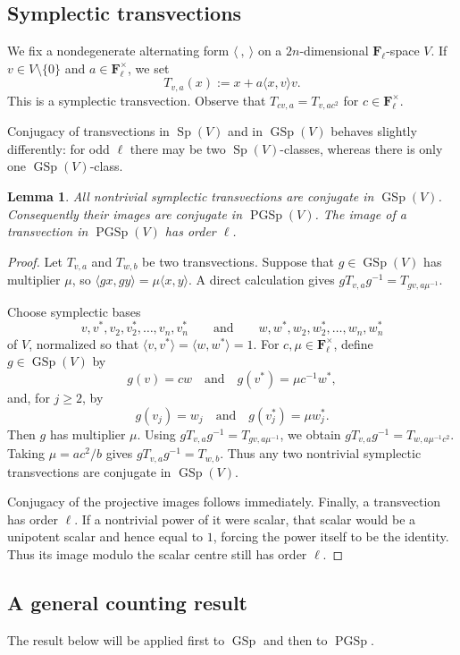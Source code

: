 \documentclass[11pt,hidelinks]{amsart}
\newtheorem{lemma}[theorem]{Lemma}
\newcommand{\F}{\mathbf F}
\newcommand{\GSp}{\operatorname{GSp}}
\newcommand{\Sp}{\operatorname{Sp}}
\newcommand{\PGSp}{\operatorname{PGSp}}
\begin{document}
\subsection{Symplectic transvections}

We fix a nondegenerate alternating form $\langle\ ,\ \rangle$ on a $2n$-dimensional $\F_\ell$-space $V$. If $v\in V\setminus\{0\}$ and $a\in\F_\ell^\times$, we set
\[T_{v,a}(x):=x+a\langle x,v\rangle v.\] This is a symplectic transvection. Observe that $T_{cv,a}=T_{v,ac^2}$ for $c\in\F_\ell^\times$.

Conjugacy of transvections in $\Sp(V)$ and in $\GSp(V)$ behaves slightly differently: for odd $\ell$ there may be two $\Sp(V)$-classes, whereas there is only one $\GSp(V)$-class.

\begin{lemma}\label{lem:GSp-conjugacy}
All nontrivial symplectic transvections are conjugate in $\GSp(V)$. Consequently their images are conjugate in $\PGSp(V)$. The image of a transvection in $\PGSp(V)$ has order $\ell$.
\end{lemma}

\begin{proof}
Let $T_{v,a}$ and $T_{w,b}$ be two transvections. Suppose that $g\in\GSp(V)$ has multiplier $\mu$, so $\langle gx,gy\rangle=\mu\langle x,y\rangle$. A direct calculation gives
$gT_{v,a}g^{-1}=T_{gv,a\mu^{-1}}$.

Choose symplectic bases
\[
v,v^*,v_2,v_2^*,\ldots,v_n,v_n^*
\qquad\text{and}\qquad
w,w^*,w_2,w_2^*,\ldots,w_n,w_n^*
\]
of $V$, normalized so that
$\langle v,v^*\rangle=\langle w,w^*\rangle=1$.
For $c,\mu\in\F_\ell^\times$, define $g\in\GSp(V)$ by
\[
g(v)=cw\quad\text{and}\quad g(v^*)=\mu c^{-1}w^*,
\]
and, for $j\geq2$, by
\[
g(v_j)=w_j\quad\text{and}\quad g(v_j^*)=\mu w_j^*.
\]
Then $g$ has multiplier $\mu$. Using
$gT_{v,a}g^{-1}=T_{gv,a\mu^{-1}}$, we obtain
$gT_{v,a}g^{-1}=T_{w,a\mu^{-1}c^2}$.
Taking $\mu=ac^2/b$ gives $gT_{v,a}g^{-1}=T_{w,b}$.
Thus any two nontrivial symplectic transvections are conjugate in
$\GSp(V)$.

Conjugacy of the projective images follows immediately. Finally, a transvection has order $\ell$. If a nontrivial power of it were scalar, that scalar would be a unipotent scalar and hence equal to $1$, forcing the power itself to be the identity. Thus its image modulo the scalar centre still has order $\ell$.
\end{proof}

\subsection{A general counting result}
The result below will be applied first to $\GSp$ and then to $\PGSp$.
\end{document}
